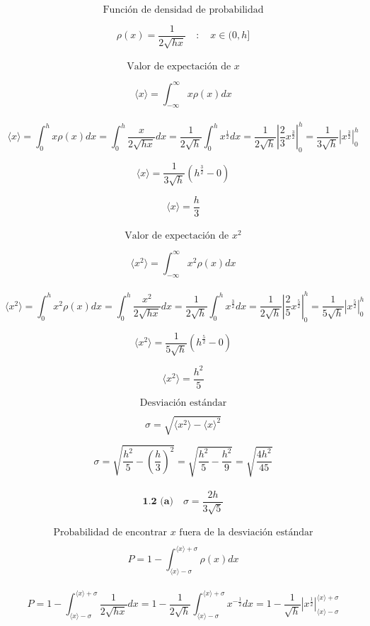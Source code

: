 \documentclass[10pt,a4papper]{article}
\begin{document}
\newpage
\[\text{Función de densidad de probabilidad}\]

\[\rho(x)=\frac{1}{2\sqrt{hx}}\quad:\quad x\in(0,h]\]\\

\[\text{Valor de expectación de }x\]

\[\langle x\rangle=\int_{-\infty}^\infty x\rho(x)dx\]\\

\[\langle x\rangle=
\int_0^h x\rho(x)dx=
\int_0^h\frac{x}{2\sqrt{hx}}dx=
\frac{1}{2\sqrt{h}}\int_0^h x^\frac{1}{2}dx=
\frac{1}{2\sqrt{h}}\left|\frac{2}{3}x^\frac{3}{2}\right|_0^h=
\frac{1}{3\sqrt{h}}\left|x^\frac{3}{2}\right|_0^h\]

\[\langle x\rangle=\frac{1}{3\sqrt{h}}\left(h^\frac{3}{2}-0\right)\]

\[\boxed{\langle x\rangle=\frac{h}{3}}\]\\

\[\text{Valor de expectación de }x^2\]

\[\langle x^2\rangle=\int_{-\infty}^\infty x^2\rho(x)dx\]\\

\[\langle x^2\rangle=
\int_0^h x^2\rho(x)dx=
\int_0^h\frac{x^2}{2\sqrt{hx}}dx=
\frac{1}{2\sqrt{h}}\int_0^h x^\frac{3}{2}dx=
\frac{1}{2\sqrt{h}}\left|\frac{2}{5}x^\frac{5}{2}\right|_0^h=
\frac{1}{5\sqrt{h}}\left|x^\frac{5}{2}\right|_0^h\]

\[\langle x^2\rangle=\frac{1}{5\sqrt{h}}\left(h^\frac{5}{2}-0\right)\]

\[\boxed{\langle x^2\rangle=\frac{h^2}{5}}\]

\newpage
\[\text{Desviación estándar}\]

\[\sigma=\sqrt{\langle x^2\rangle-\langle x\rangle^2}\]

\[\sigma=
\sqrt{\frac{h^2}{5}-\left(\frac{h}{3}\right)^2}=
\sqrt{\frac{h^2}{5}-\frac{h^2}{9}}=
\sqrt{\frac{4h^2}{45}}\]\\

\[\boxed{\textbf{1.2 (a)}\quad\sigma=\frac{2h}{3\sqrt{5}}}\]\\

\[\text{Probabilidad de encontrar $x$ fuera de la desviación estándar}\]

\[P=1-\int_{\langle x\rangle-\sigma}^{\langle x\rangle+\sigma}\rho(x)dx\]\\

\[P=
1-\int_{\langle x\rangle-\sigma}^{\langle x\rangle+\sigma}\frac{1}{2\sqrt{hx}}dx=
1-\frac{1}{2\sqrt{h}}\int_{\langle x\rangle-\sigma}^{\langle x\rangle+\sigma}x^{-\frac{1}{2}}dx=
1-\frac{1}{\sqrt{h}}\left|x^{\frac{1}{2}}\right|_{\langle x\rangle-\sigma}^{\langle x\rangle+\sigma}\]
\end{document}
